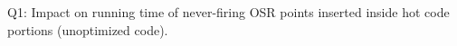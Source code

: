 \label{fig:osr-code-quality-base} Q1: Impact on running time of never-firing OSR points inserted inside hot code portions (unoptimized code).


